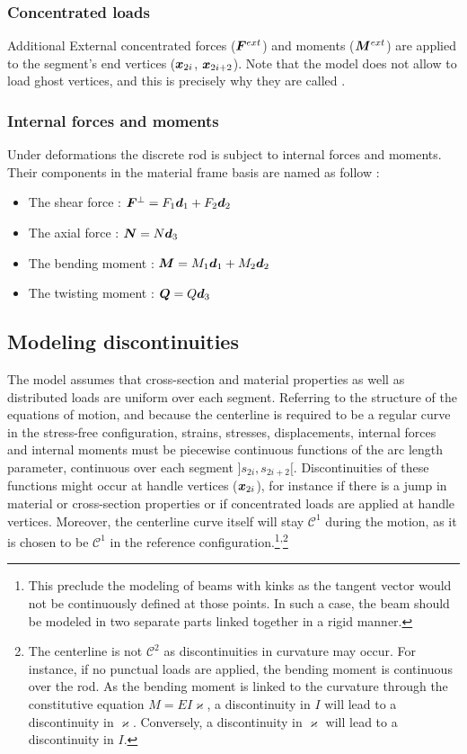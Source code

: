 \subsubsection{Concentrated loads}
Additional External concentrated forces ($\boldsymbol{F}^{ext}$) and moments ($\boldsymbol{M}^{ext}$) are applied to the segment's end vertices ($\boldsymbol{x}_{2i}$,  $\boldsymbol{x}_{2i+2}$). Note that the model does not allow to load ghost vertices, and this is precisely why they are called .

 \subsubsection{Internal forces and moments}
Under deformations the discrete rod is subject to internal forces and moments. Their components in the material frame basis are named as follow :
\begin{itemize}
\item The shear force : $\boldsymbol{F}^{\perp} = F_1 \boldsymbol{d}_1 + F_2 \boldsymbol{d}_2$ 
\item The axial force : $\boldsymbol{N} = N \boldsymbol{d}_3$
\item The bending moment : $\boldsymbol{M} = M_1 \boldsymbol{d}_1 + M_2 \boldsymbol{d}_2$ 
\item The twisting moment : $\boldsymbol{Q} = Q \boldsymbol{d}_3$ 
\end{itemize}

 \subsection{Modeling discontinuities}
The model assumes that cross-section and material properties as well as distributed loads are uniform over each segment. Referring to the structure of the equations of motion, and because the centerline is required to be a regular curve in the stress-free configuration, strains, stresses, displacements, internal forces and internal moments must be piecewise continuous functions of the arc length parameter, continuous over each segment $]s_{2i},s_{2i+2}[$. Discontinuities of these functions might occur at handle vertices ($\boldsymbol{x}_{2i}$), for instance if there is a jump in material or cross-section properties or if concentrated loads are applied at handle vertices. Moreover, the centerline curve itself will stay $\mathcal{C}^1$ during the motion, as it is chosen to be $\mathcal{C}^1$ in the reference configuration.\footnote{This preclude the modeling of beams with kinks as the tangent vector would not be continuously defined at those points. In such a case, the beam should be modeled in two separate parts linked together in a rigid manner.}\textsuperscript{,}\footnote{The centerline is not $\mathcal{C}^2$ as discontinuities in curvature may occur. For instance, if no punctual loads are applied, the bending moment is continuous over the rod. As the bending moment is linked to the curvature through the constitutive equation $M = EI\varkappa$, a discontinuity in $I$ will lead to a discontinuity in $\varkappa$. Conversely, a discontinuity in $\varkappa$ will lead to a discontinuity in $I$.}

